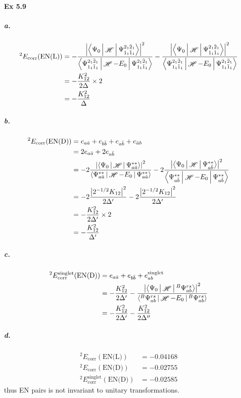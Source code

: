 \documentclass[a4paper]{article}
\DeclareMathOperator{\sH}{\mathscr{H}}
\DeclareMathOperator{\corr}{\mathrm{corr}}
\newcommand{\ex}[1]{\paragraph{Ex #1}}
\newcommand{\subex}[1]{\subparagraph{#1}}
\numberwithin{equation}{subsection}
\begin{document}
\ex{5.9}
\subex{a.}
\begin{align}
{^2 }E_{\corr}(\text{EN(L)}) 
&= -\dfrac{\abs{\Braket{\Psi_0|\sH|\Psi_{1_1\bar{1}_1}^{2_1\bar{2}_1}}}^2 }{\Braket{\Psi_{1_1\bar{1}_1}^{2_1\bar{2}_1} | \sH - E_0 | \Psi_{1_1\bar{1}_1}^{2_1\bar{2}_1}}} 
- \dfrac{\abs{\Braket{\Psi_0|\sH|\Psi_{1_1\bar{1}_1}^{2_1\bar{2}_1}}}^2 }{\Braket{\Psi_{1_1\bar{1}_1}^{2_1\bar{2}_1} | \sH - E_0 | \Psi_{1_1\bar{1}_1}^{2_1\bar{2}_1}}} \notag\\
&= -\dfrac{K_{12}^2}{2\Delta}\times 2 \notag\\
&= -\dfrac{K_{12}^2}{\Delta}
\end{align}
\subex{b.}
\begin{align}
{^2 }E_{\corr}(\text{EN(D)}) &= e_{a\bar{a}} + e_{b\bar{b}} + e_{a\bar{b}} + e_{\bar{a}b} \notag\\
&= 2e_{a\bar{a}} + 2e_{a\bar{b}} \notag\\
&= -2\dfrac{\abs{\Braket{\Psi_0|\sH|\Psi_{a\bar{a}}^{**}}}^2 }{\Braket{\Psi_{a\bar{a}}^{**} | \sH-E_0 | \Psi_{a\bar{a}}^{**}}} 
- 2\dfrac{\abs{\Braket{\Psi_0|\sH|\Psi_{a\bar{b}}^{**}}}^2 }{\Braket{\Psi_{a\bar{b}}^{**} | \sH - E_0 | \Psi_{a\bar{b}}^{**}}} 
\notag\\
&= -2\dfrac{\abs{2^{-1/2}K_{12}}^2}{2\Delta'} -2\dfrac{\abs{2^{-1/2}K_{12}}^2}{2\Delta'} \notag\\
&= -\dfrac{K_{12}^2}{2\Delta'}\times 2 \notag\\
&= -\dfrac{K_{12}^2}{\Delta'}
\end{align}
\subex{c.}
\begin{align}
{^2 }E_{\corr}^{\text{singlet}}(\text{EN(D)}) &= e_{a\bar{a}} + e_{b\bar{b}} + e_{ab}^{\text{singlet}} \notag\\
&= -\dfrac{K_{12}^2}{2\Delta'} -\dfrac{\abs{\Braket{\Psi_0|\sH| ^B\Psi_{ab}^{rs}}}^2 }{\Braket{ ^B\Psi_{ab}^{rs} | \sH-E_0 | ^B\Psi_{ab}^{rs}}}  \notag\\
&= -\dfrac{K_{12}^2}{2\Delta'} -\dfrac{K_{12}^2}{2\Delta''}
\end{align}
\subex{d.}
\begin{align}
{^2 }E_{\corr}(\text{EN(L)}) &= -0.04168 \\
{^2 }E_{\corr}(\text{EN(D)}) &= -0.02755 \\
{^2 }E_{\corr}^{\text{singlet}}(\text{EN(D)}) &= -0.02585
\end{align}
thus EN pairs is not invariant to unitary transformations.
\end{document}
